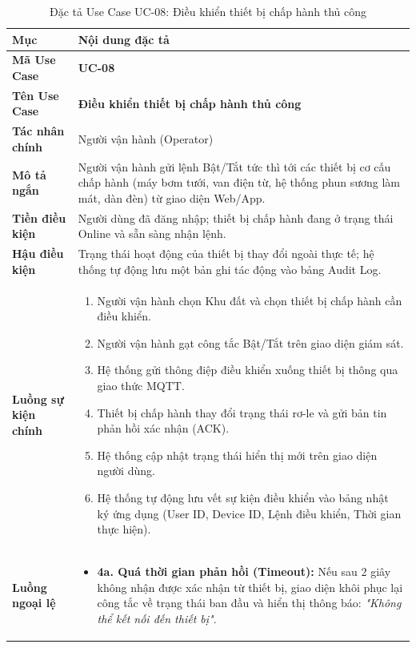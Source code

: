 \begin{table}[H]
\centering
\small
\begin{tabularx}{\textwidth}{|p{3.2cm}|X|}
\hline
\textbf{Mục} & \textbf{Nội dung đặc tả} \\ \hline
\textbf{Mã Use Case} & \textbf{UC-08} \\ \hline
\textbf{Tên Use Case} & \textbf{Điều khiển thiết bị chấp hành thủ công} \\ \hline
\textbf{Tác nhân chính} & Người vận hành (Operator) \\ \hline
\textbf{Mô tả ngắn} & Người vận hành gửi lệnh Bật/Tắt tức thì tới các thiết bị cơ cấu chấp hành (máy bơm tưới, van điện từ, hệ thống phun sương làm mát, dàn đèn) từ giao diện Web/App. \\ \hline
\textbf{Tiền điều kiện} & Người dùng đã đăng nhập; thiết bị chấp hành đang ở trạng thái Online và sẵn sàng nhận lệnh. \\ \hline
\textbf{Hậu điều kiện} & Trạng thái hoạt động của thiết bị thay đổi ngoài thực tế; hệ thống tự động lưu một bản ghi tác động vào bảng Audit Log. \\ \hline
\textbf{Luồng sự kiện chính} & 
\begin{enumerate}[leftmargin=*, nosep]
    \item Người vận hành chọn Khu đất và chọn thiết bị chấp hành cần điều khiển.
    \item Người vận hành gạt công tắc Bật/Tắt trên giao diện giám sát.
    \item Hệ thống gửi thông điệp điều khiển xuống thiết bị thông qua giao thức MQTT.
    \item Thiết bị chấp hành thay đổi trạng thái rơ-le và gửi bản tin phản hồi xác nhận (ACK).
    \item Hệ thống cập nhật trạng thái hiển thị mới trên giao diện người dùng.
    \item Hệ thống tự động lưu vết sự kiện điều khiển vào bảng nhật ký ứng dụng (User ID, Device ID, Lệnh điều khiển, Thời gian thực hiện).
\end{enumerate} \\ \hline
\textbf{Luồng ngoại lệ} & 
\begin{itemize}[leftmargin=*, nosep]
    \item \textbf{4a. Quá thời gian phản hồi (Timeout):} Nếu sau 2 giây không nhận được xác nhận từ thiết bị, giao diện khôi phục lại công tắc về trạng thái ban đầu và hiển thị thông báo: \textit{"Không thể kết nối đến thiết bị"}.
\end{itemize} \\ \hline
\end{tabularx}
\caption{Đặc tả Use Case UC-08: Điều khiển thiết bị chấp hành thủ công}
\label{tab:uc_08}
\end{table}

